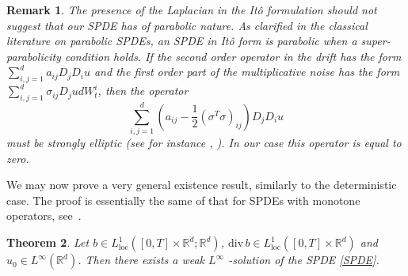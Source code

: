 \documentclass[a4paper,11pt]{article}
\newtheorem{theorem}{Theorem}
\newtheorem{remark}[theorem]{Remark}
\begin{document}
\begin{remark}
The presence of the Laplacian in the It\^{o} formulation should not suggest
that our SPDE has of parabolic nature. As clarified in the classical
literature on parabolic SPDEs, an SPDE in It\^{o} form is parabolic when a
super-parabolicity condition holds. If the second order operator in the
drift has the form $\sum_{i,j=1}^{d}a_{ij}D_{j}D_{i}u$ and the first order
part of the multiplicative noise has the form $\sum_{i,j=1}^{d}\sigma
_{ij}D_{j}udW_{t}^{i}$, then the operator
\begin{equation*}
\sum_{i,j=1}^{d}\left( a_{ij}-\frac{1}{2}\left( \sigma ^{T}\sigma \right)
_{ij}\right) D_{j}D_{i}u
\end{equation*}
must be strongly elliptic (see for instance \cite{Roz}, \cite{DaPZab}). In
our case this operator is equal to zero.
\end{remark}

We may now prove a very general existence result, similarly to the
deterministic case. The proof is essentially the same of that for SPDEs with
monotone operators, see~\cite{KrylRoz,Pard,Roz}.

\begin{theorem}
Let $b\in L_{\mathrm{loc}}^{1}([0,T]\times \mathbb{R}^{d};\mathbb{R}^{d})$, $%
\mathrm{div}\,b\in L_{\mathrm{loc}}^{1}([0,T]\times \mathbb{R}^{d})$ and $%
u_{0}\in L^{\infty }(\mathbb{R}^{d})$. Then there exists a weak $L^{\infty }$%
-solution of the SPDE \eqref{SPDE}.
\end{theorem}
\end{document}

